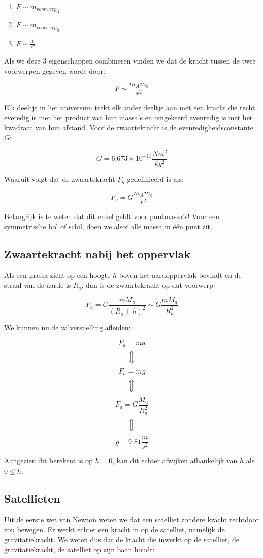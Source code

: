 \documentclass[12pt,a4paper]{article}
\newcommand{\Luda}{\Big\Updownarrow}
\begin{document}
    \begin{enumerate}
    	\item $F \sim m_{voorwerp_{A}}$
    	\item $F \sim m_{voorwerp_{B}}$
    	\item $F \sim \frac{1}{r^{2}}$
    \end{enumerate}
    
    Als we deze 3 eigenschappen combineren vinden we dat de kracht tussen de twee voorwerpen gegeven wordt door:
    
    $$ F \sim \frac{m_{A}m_{b}}{r^{2}} $$

    Elk deeltje in het universum trekt elk ander deeltje aan met een kracht die recht everedig is met het product van hun massa's en omgekeerd
    evenredig is met het kwadraat van hun afstand. Voor de zwaartekracht is de evenredigheidsconstante $G$:
    
    $$ G = 6.673 \times 10^{-11} \frac{Nm^{2}}{kg^{2}} $$ 
    
    Waaruit volgt dat de zwaartekracht $F_{g}$ gedefinieerd is als:
    
    $$ F_{g} = G \frac{m_{A}m_{b}}{r^{2}} $$ 
    
    Belangrijk is te weten dat dit enkel geldt voor puntmassa's! Voor een symmetrische bol of schil, 
    doen we alsof alle massa in één punt zit.
    
    \subsection{Zwaartekracht nabij het oppervlak}
    Als een massa zicht op een hoogte $h$ boven het aardoppervlak bevindt en de straal van de aarde is $R_{a}$, dan is de zwaartekracht op dat voorwerp:
    
    $$ F_{a} = G\frac{mM_{a}}{(R_{a} + h)^{2}} \sim G\frac{mM_{a}}{R_{a}^{2}}$$
    
    We kunnen nu de valversnelling afleiden:
    
    $$ F_{a} = ma $$
    $$\Luda$$
    $$ F_{a} = mg $$
    $$\Luda$$
    $$ F_{a} = G\frac{M_{a}}{R_{a}^{2}} $$
    $$\Luda$$
    $$ g = 9.81 \frac{m}{s^{2}} $$
    
    Aangezien dit berekent is op $h = 0$, kan dit echter afwijken afhankelijk van $h$ als $0 \leq h$. 
    
    \subsection{Satellieten}
    Uit de eerste wet van Newton weten we dat een satelliet zondere kracht rechtdoor zou bewegen. Er werkt echter een kracht in
    op de satelliet, namelijk de gravitatiekracht. We weten dus dat de kracht die inwerkt op de satelliet, de gravitatiekracht, de satelliet
    op zijn baan houdt:
    
\end{document}
